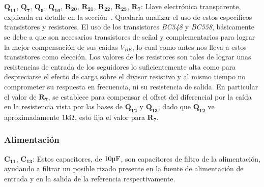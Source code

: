 $\bm{Q_{11}}$, $\bm{Q_{7}}$, $\bm{Q_{9}}$, $\bm{Q_{10}}$, $\bm{R_{20}}$, $\bm{R_{21}}$, $\bm{R_{22}}$, $\bm{R_{23}}$, $\bm{R_{7}}$: Llave electrónica transparente, explicada en detalle en la sección~. Quedaría analizar el uso de estos específicos transistores y resistores. El uso de los transistores \textit{BC548} y \textit{BC558}, básicamente se debe a que son necesarios transistores de señal y complementarios para lograr la mejor compensación de sus caídas $V_{BE}$, lo cual como antes nos lleva a estos transistores como elección. Los valores de los resistores son tales de lograr unas resistencias de entrada de los seguidores lo suficientemente alta como para despreciarse el efecto de carga sobre el divisor resistivo y al mismo tiempo no comprometer su respuesta en frecuencia, ni su resistencia de salida. En particular el valor de $\bm{R_{7}}$, se establece para compensar el offset del diferencial por la caída en la resistencia vista por las bases de $\bm{Q_{12}}$ y $\bm{Q_{13}}$, dado que $\bm{Q_{12}}$ ve aproximadamente $1 \si[per-mode=symbol]{\kilo\ohm}$, esto fija el valor para  $\bm{R_{7}}$.\\

\subsubsection{Alimentación}

$\bm{C_{11}}$, $\bm{C_{13}}$: Estos capacitores, de $10 \si[per-mode=symbol]{\micro\farad}$, son capacitores de filtro de la alimentación, ayudando a filtrar un posible rizado presente en la fuente de alimentación de entrada y en la salida de la referencia respectivamente.\\



\clearpage
